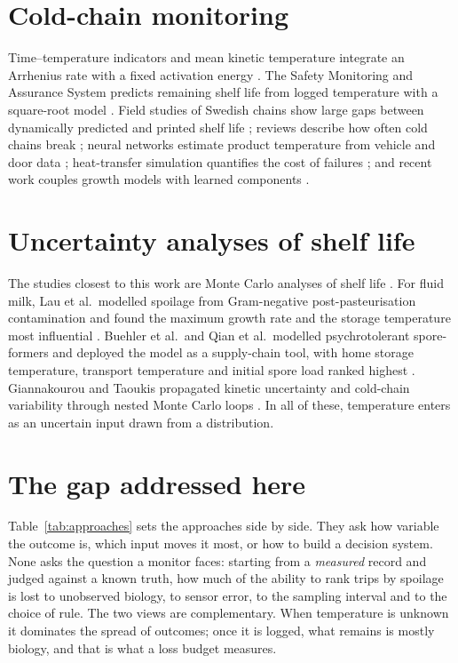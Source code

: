 \documentclass[11pt,a4paper,twoside,openany]{book}
\theoremstyle{plain}\newtheorem{proposition}{Proposition}\newtheorem{corollary}{Corollary}
\theoremstyle{definition}\newtheorem{definition}{Definition}[chapter]
\begin{document}
\section{Cold-chain monitoring}
Time--temperature indicators and mean kinetic temperature integrate an Arrhenius rate with a fixed activation energy \cite{taoukis1989,kim2020}. The Safety Monitoring and Assurance System predicts remaining shelf life from logged temperature with a square-root model \cite{koutsoumanis2001,koutsoumanis2005}. Field studies of Swedish chains show large gaps between dynamically predicted and printed shelf life \cite{goransson2018}; reviews describe how often cold chains break \cite{ndraha2018}; neural networks estimate product temperature from vehicle and door data \cite{zou2023}; heat-transfer simulation quantifies the cost of failures \cite{muller2026}; and recent work couples growth models with learned components \cite{sofat2026}.

\section{Uncertainty analyses of shelf life}
The studies closest to this work are Monte Carlo analyses of shelf life \cite{nauta2000}. For fluid milk, Lau et al.\ modelled spoilage from Gram-negative post-pasteurisation contamination and found the maximum growth rate and the storage temperature most influential \cite{lau2022}. Buehler et al.\ and Qian et al.\ modelled psychrotolerant spore-formers and deployed the model as a supply-chain tool, with home storage temperature, transport temperature and initial spore load ranked highest \cite{buehler2018,qian2023}. Giannakourou and Taoukis propagated kinetic uncertainty and cold-chain variability through nested Monte Carlo loops \cite{giannakourou2020}. In all of these, temperature enters as an uncertain input drawn from a distribution.

\section{The gap addressed here}
Table~\ref{tab:approaches} sets the approaches side by side. They ask how variable the outcome is, which input moves it most, or how to build a decision system. None asks the question a monitor faces: starting from a \emph{measured} record and judged against a known truth, how much of the ability to rank trips by spoilage is lost to unobserved biology, to sensor error, to the sampling interval and to the choice of rule. The two views are complementary. When temperature is unknown it dominates the spread of outcomes; once it is logged, what remains is mostly biology, and that is what a loss budget measures.
\end{document}
